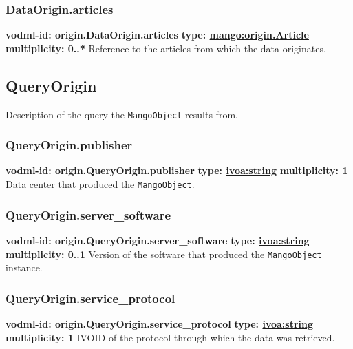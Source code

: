     \subsubsection{DataOrigin.articles}
      \textbf{vodml-id: origin.DataOrigin.articles} \newline
      \textbf{type: \hyperref[sect:origin.Article]{mango:origin.Article}} \newline
      \textbf{multiplicity: 0..*} \newline
      Reference to the articles from which the data originates.

  \subsection{QueryOrigin}
  \label{sect:origin.QueryOrigin}
    Description of the query the \texttt{MangoObject} results from.

    \subsubsection{QueryOrigin.publisher}
      \textbf{vodml-id: origin.QueryOrigin.publisher} \newline
      \textbf{type: \hyperref[sect:ivoa]{ivoa:string}} \newline
      \textbf{multiplicity: 1} \newline
      Data center that produced the \texttt{MangoObject}.

    \subsubsection{QueryOrigin.server\_software}
      \textbf{vodml-id: origin.QueryOrigin.server\_software} \newline
      \textbf{type: \hyperref[sect:ivoa]{ivoa:string}} \newline
      \textbf{multiplicity: 0..1} \newline
      Version of the software that produced the \texttt{MangoObject} instance.

    \subsubsection{QueryOrigin.service\_protocol}
      \textbf{vodml-id: origin.QueryOrigin.service\_protocol} \newline
      \textbf{type: \hyperref[sect:ivoa]{ivoa:string}} \newline
      \textbf{multiplicity: 1} \newline
      IVOID \citep{2007ivoa.spec.0314P} of the protocol through which the data was retrieved.

